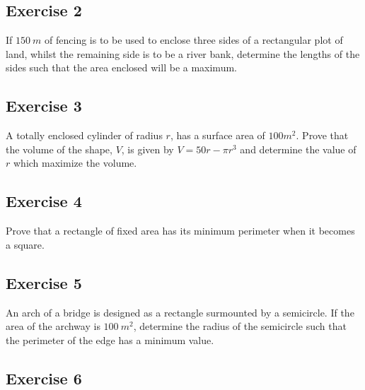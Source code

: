 \documentclass[
  11pt,
  oneside]{book}
\newcommand{\slide}{}
\theoremstyle{definition}
\theoremstyle{definition}
\theoremstyle{definition}
\theoremstyle{definition}
\theoremstyle{remark}
\begin{document}
\slide

\subsection*{Exercise 2}\label{exercise-2-4}

If \(150\ m\) of fencing is to be used to enclose three sides of a rectangular plot of land, whilst the remaining side is to be a river bank, determine the lengths of the sides such that the area enclosed will be a maximum.

\slide

\subsection*{Exercise 3}\label{exercise-3-3}

A totally enclosed cylinder of radius \(r\), has a surface area of \(100 m^2\). Prove that the volume of the shape, \(V\), is given by \(V = 50r - \pi r^3\) and determine the value of \(r\) which maximize the volume.

\slide

\subsection*{Exercise 4}\label{exercise-4-3}

Prove that a rectangle of fixed area has its minimum perimeter when it becomes a square.

\slide

\subsection*{Exercise 5}\label{exercise-5-2}

An arch of a bridge is designed as a rectangle surmounted by a semicircle. If the area of the archway is \(100\ m^2\), determine the radius of the semicircle such that the perimeter of the edge has a minimum value.

\slide

\subsection*{Exercise 6}\label{exercise-6-2}
\end{document}
